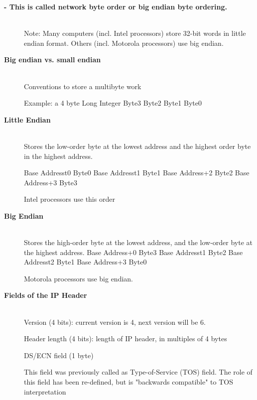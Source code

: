 \begin{description}
\begin{enumerate}
\end{enumerate}


\os{\newpage}\item[{\rot\bf  - This is called network byte order or big endian byte ordering. }]~\\[-3ex]

\bi
  \ite Note: Many computers (incl. Intel processors) store 32-bit words in little endian format. Others (incl. Motorola processors) use big endian.
\ei


\os{\newpage}\item[{\rot\bf  Big endian vs. small endian }]~\\[-3ex]


\bi
  \ite Conventions to store a multibyte work

  \ite Example: a 4 byte Long Integer Byte3 Byte2 Byte1 Byte0

\ei


\os{\newpage}\item[{\rot\bf  Little Endian }]~\\[-3ex]

\bi
  \ite Stores the low-order byte at the lowest address and the highest order byte in the highest address.
\ei

Base Addresst0 Byte0 Base Addresst1 Byte1 Base Address+2 Byte2 Base Address+3 Byte3

\bi
  \ite Intel processors use this order
\ei


\os{\newpage}\item[{\rot\bf  Big Endian }]~\\[-3ex]

\bi
  \ite Stores the high-order byte at the lowest address, and the low-order byte at the highest address.
Base Address+0 Byte3
Base Addresst1 Byte2
Base Addresst2 Byte1
Base Address+3 Byte0
\ei

Motorola processors use big endian.

\os{\newpage}\item[{\rot\bf Fields of the IP Header } ]~\\[-3ex]


\bi
  \ite Version (4 bits): current version is 4, next version will be 6.

  \ite Header length (4 bits): length of IP header, in multiples of 4 bytes

  \ite DS/ECN field (1 byte)

\ei
\bi
 \ite This field was previously called as Type-of-Service (TOS) field. The role of this field has been re-defined, but is "backwards compatible" to TOS interpretation
 \ei


\end{description}
